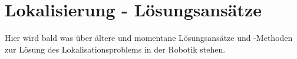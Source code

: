 \clearpage
\chapter{\textbf{Lokalisierung - Lösungsansätze}}\label{chap:Lokalisierung - Lösungsansätze}

Hier wird bald was über ältere und momentane Lösungsansätze und -Methoden zur Lösung des Lokalisationsproblems in der Robotik stehen.